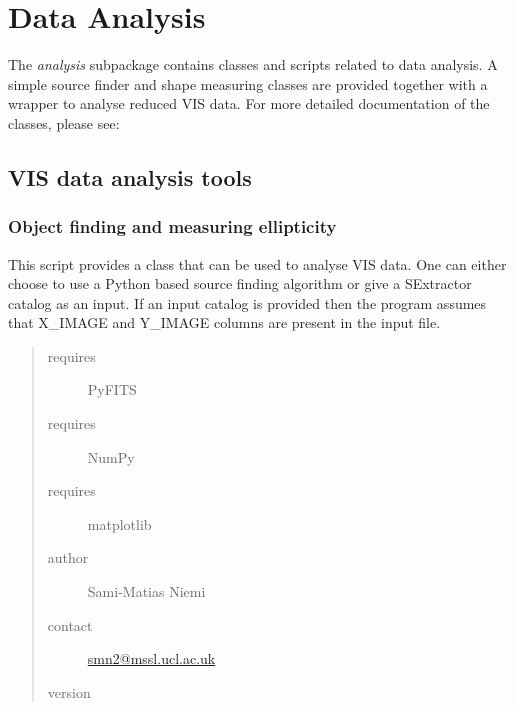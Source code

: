 \documentclass[a4paper,12pt,english]{sphinxmanual}
\begin{document}
\chapter{Data Analysis}
\label{index:data-analysis}
The \emph{analysis} subpackage contains classes and scripts related to data analysis. A simple source finder and shape
measuring classes are provided together with a wrapper to analyse reduced VIS data. For more detailed
documentation of the classes, please see:


\section{VIS data analysis tools}
\label{analysis::doc}\label{analysis:module-analysis.analyse}\label{analysis:vis-data-analysis-tools}

\subsection{Object finding and measuring ellipticity}
\label{analysis:object-finding-and-measuring-ellipticity}
This script provides a class that can be used to analyse VIS data.
One can either choose to use a Python based source finding algorithm or
give a SExtractor catalog as an input. If an input catalog is provided
then the program assumes that X\_IMAGE and Y\_IMAGE columns are present
in the input file.
\begin{quote}\begin{description}
\item[{requires}] \leavevmode
PyFITS

\item[{requires}] \leavevmode
NumPy

\item[{requires}] \leavevmode
matplotlib

\item[{author}] \leavevmode
Sami-Matias Niemi

\item[{contact}] \leavevmode
\href{mailto:smn2@mssl.ucl.ac.uk}{smn2@mssl.ucl.ac.uk}

\item[{version}] 

\end{description}\end{quote}
\end{document}
